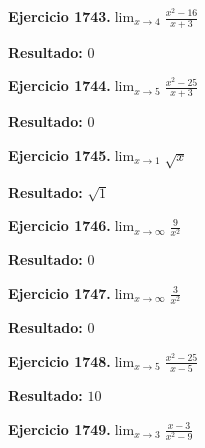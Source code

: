 \documentclass[10pt,a4paper]{article}
\begin{document}
\begin{ejbox}
\textbf{Ejercicio 1743.}\quad $\lim_{x\to 4} \frac{x^2-16}{x+3}$
\end{ejbox}

\begin{solbox}
\textbf{Resultado:} \(\displaystyle 0\)
\end{solbox}

\newpage
\begin{ejbox}
\textbf{Ejercicio 1744.}\quad $\lim_{x\to 5} \frac{x^2-25}{x+3}$
\end{ejbox}

\begin{solbox}
\textbf{Resultado:} \(\displaystyle 0\)
\end{solbox}

\begin{ejbox}
\textbf{Ejercicio 1745.}\quad $\lim_{x\to 1} \sqrt{x}$
\end{ejbox}

\begin{solbox}
\textbf{Resultado:} \(\displaystyle \sqrt{1}\)
\end{solbox}

\begin{ejbox}
\textbf{Ejercicio 1746.}\quad $\lim_{x\to \infty} \frac{9}{x^2}$
\end{ejbox}

\begin{solbox}
\textbf{Resultado:} \(\displaystyle 0\)
\end{solbox}

\newpage
\begin{ejbox}
\textbf{Ejercicio 1747.}\quad $\lim_{x\to \infty} \frac{3}{x^2}$
\end{ejbox}

\begin{solbox}
\textbf{Resultado:} \(\displaystyle 0\)
\end{solbox}

\begin{ejbox}
\textbf{Ejercicio 1748.}\quad $\lim_{x\to 5} \frac{x^2-25}{x-5}$
\end{ejbox}

\begin{solbox}
\textbf{Resultado:} \(\displaystyle 10\)
\end{solbox}

\begin{ejbox}
\textbf{Ejercicio 1749.}\quad $\lim_{x\to 3} \frac{x-3}{x^2-9}$
\end{ejbox}
\end{document}
